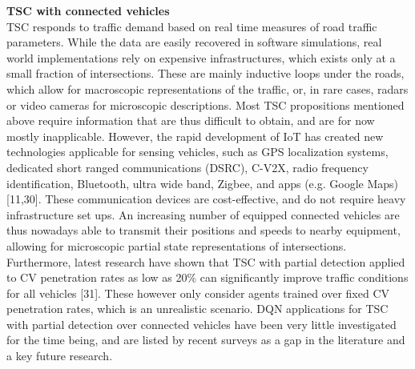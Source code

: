 \textbf{TSC with connected vehicles} \\
TSC responds to traffic demand based on real time measures of road traffic parameters. While the data are easily recovered in software simulations, real world implementations rely on expensive infrastructures, which exists only at a small fraction of intersections. These are mainly inductive loops under the roads, which allow for macroscopic representations of the traffic, or, in rare cases, radars or video cameras for microscopic descriptions. Most TSC propositions mentioned above require information that are thus difficult to obtain, and are for now mostly inapplicable. However, the rapid  development of IoT has created new technologies applicable for sensing vehicles, such as GPS localization systems, dedicated short ranged communications (DSRC), C-V2X, radio frequency identification, Bluetooth, ultra wide band, Zigbee, and apps (e.g. Google Maps) [11,30]. These communication devices are cost-effective, and do not require heavy infrastructure set ups. An increasing number of equipped connected vehicles are thus nowadays able to transmit their positions and speeds to nearby equipment, allowing for microscopic partial state representations of intersections. Furthermore, latest research have shown that TSC with partial detection applied to CV penetration rates as low as 20\% can significantly improve traffic conditions for all vehicles [31]. These however only consider agents trained over fixed CV penetration rates, which is an unrealistic scenario. DQN applications for TSC with partial detection over connected vehicles have been very little investigated for the time being, and are listed by recent surveys as a gap in the literature and a key future research. \\

